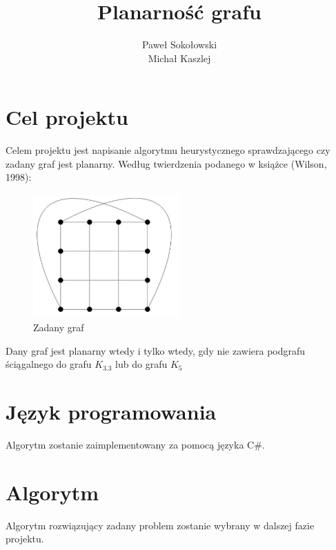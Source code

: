 \documentclass[a4 122pt]{article}
\title{Planarność grafu}
\author{Paweł Sokołowski\\Michał Kaszlej}
\begin{document}
\maketitle

	\section{Cel projektu}

		Celem projektu jest napisanie algorytmu heurystycznego sprawdzającego czy zadany graf jest planarny.
		Według twierdzenia podanego w książce (Wilson, 1998):

		\begin{figure}[h]
			\begin{center}
				\includegraphics[width=0.5\textwidth]{include/graf.png}
				\caption{Zadany graf}
			\end{center}
		\end{figure}


		Dany graf jest planarny wtedy i tylko wtedy, gdy nie zawiera podgrafu ściągalnego do grafu $K_{3.3}$ lub do grafu $ K_5 $

	\section{Język programowania} 

		Algorytm zostanie zaimplementowany za pomocą języka C\#.

	\section{Algorytm}

		Algorytm rozwiązujący zadany problem zostanie wybrany w dalszej fazie projektu.
\end{document}
